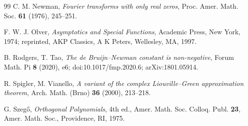 \documentclass[11pt]{amsart}
\theoremstyle{definition}
\theoremstyle{remark}
\numberwithin{equation}{section}
\begin{document}
\begin{thebibliography}{99}
 C. M. Newman, \emph{Fourier transforms with only real zeros}, Proc. Amer. Math. Soc. \textbf{61} (1976), 245--251.

 F. W. J. Olver, \emph{Asymptotics and Special Functions}, Academic Press, New York, 1974; reprinted, AKP Classics, A K Peters, Wellesley, MA, 1997.

 B. Rodgers, T. Tao, \emph{The de Bruijn--Newman constant is non-negative}, Forum Math. Pi \textbf{8} (2020), e6; doi:10.1017/fmp.2020.6; arXiv:1801.05914.

 R. Spigler, M. Vianello, \emph{A variant of the complex Liouville--Green approximation theorem}, Arch. Math. (Brno) \textbf{36} (2000), 213--218.

 G. Szeg\H{o}, \emph{Orthogonal Polynomials}, 4th ed., Amer. Math. Soc. Colloq. Publ. \textbf{23}, Amer. Math. Soc., Providence, RI, 1975.

\end{thebibliography}
\end{document}

